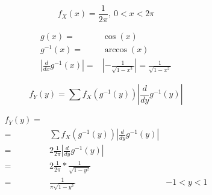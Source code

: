 \documentclass{article}
\begin{document}
    \begin{equation}
      f_X(x) = \frac{1}{2\pi}, \ 0 < x < 2\pi
    \end{equation}


    \begin{align}
      g(x) =& \cos(x) \\
      g^{-1}(x) =& \arccos(x) \\
      \left| \frac{d}{dx} g^{-1} (x) \right| =& \left| - \frac{1}{\sqrt{1-x^2}} \right| =  \frac{1}{\sqrt{1-x^2}}
    \end{align}

    \begin{equation}
    \label{eq:density_transformation_technique}
      f_Y (y) = \sum f_X \left( g^{-1} (y) \right) \left| \frac{d}{dy} g^{-1} (y) \right|
    \end{equation}

    \begin{figure}
      \center
      \caption{}
      \label{}
    \end{figure}

    \begin{align}
      f_Y (y) =& &\\
              =& \sum f_X \left( g^{-1} (y) \right) \left| \frac{d}{dy} g^{-1} (y) \right| &\\
              =& 2\frac{1}{2\pi} \left| \frac{d}{dy} g^{-1} (y) \right| &\\
              =& 2\frac{1}{2\pi}*\frac{1}{\sqrt{1-y^2}} &\\
              =& \frac{1}{\pi\sqrt{1-y^2}} & -1<y<1
    \end{align}
  \nocite{prob2017}

  
  
\end{document}
